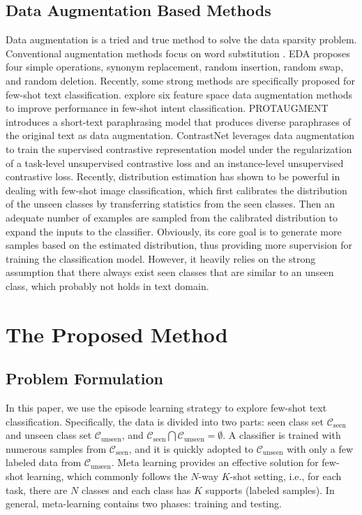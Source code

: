 \documentclass[letterpaper]{article} %
\begin{document}
\subsection{Data Augmentation Based Methods}
Data augmentation is a tried and true method to solve the data sparsity problem. Conventional augmentation methods focus on word substitution \cite{NIPS2015_250cf8b5}. EDA \cite{eda} proposes four simple operations, synonym replacement, random insertion, random swap, and random deletion. Recently, some strong methods are specifically proposed for few-shot text classification. \citet{DBLP:conf/acl-deeplo/KumarGLC19} explore six feature space data augmentation methods to improve performance in few-shot intent classification. PROTAUGMENT \cite{ProtAugment} introduces a short-text paraphrasing model that produces diverse paraphrases of the original text as data augmentation. ContrastNet \cite{ContrastNet} leverages data augmentation to train the supervised contrastive representation model under the regularization of a task-level unsupervised contrastive loss and an instance-level unsupervised contrastive loss. Recently, distribution estimation \cite{freelunch} has shown to be powerful in dealing with few-shot image classification, which first calibrates the distribution of the unseen classes by transferring statistics from the seen classes. Then an adequate number of examples are sampled from the calibrated distribution to expand the inputs to the classifier. Obviously, its core goal is to generate more samples based on the estimated distribution, thus providing more supervision for training the classification model. However, it heavily relies on the strong assumption that there always exist seen classes that are similar to an unseen class, which probably not holds in text domain.

\section{The Proposed Method}
\subsection{Problem Formulation}
In this paper, we use the episode learning strategy to explore few-shot text classification. Specifically, the data is divided into two parts: seen class set $\mathcal{C}_\text{seen}$ and unseen class set $\mathcal{C}_\text{unseen}$, and $\mathcal{C}_\text{seen} \bigcap \mathcal{C}_\text{unseen}={\emptyset}$. A classifier is trained with numerous samples from $\mathcal{C}_\text{seen}$, and it is quickly adopted to $\mathcal{C}_\text{unseen}$ with only a few labeled data from $\mathcal{C}_\text{unseen}$. Meta learning provides an effective solution for few-shot learning, which commonly follows the $N$-way $K$-shot setting, i.e., for each task, there are $N$ classes and each class has $K$ supports (labeled samples). In general, meta-learning contains two phases: training and testing.
\end{document}
